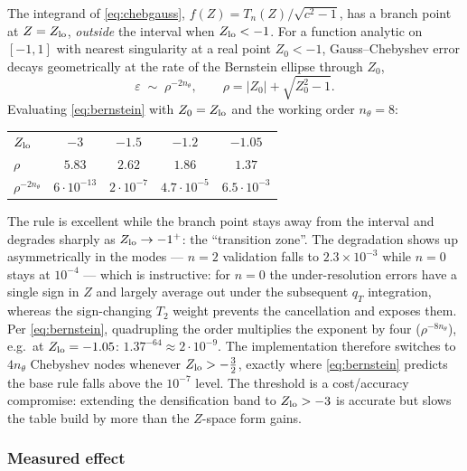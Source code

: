 \documentclass[11pt]{article}
\begin{document}
The integrand of \eqref{eq:chebgauss}, $f(Z)=T_n(Z)/\sqrt{c^{2}-1}$, has
a branch point at $Z=Z_{\rm lo}$, \emph{outside} the interval when
$Z_{\rm lo}<-1$.  For a function analytic on $[-1,1]$ with nearest
singularity at a real point $Z_0<-1$, Gauss--Chebyshev error decays
geometrically at the rate of the Bernstein ellipse through $Z_0$,
\begin{equation}
\varepsilon \;\sim\; \rho^{-2n_\theta},
\qquad
\rho=|Z_0|+\sqrt{Z_0^{2}-1} .
\label{eq:bernstein}
\end{equation}
Evaluating \eqref{eq:bernstein} with $Z_0=Z_{\rm lo}$ and the working
order $n_\theta=8$:
\begin{center}
\begin{tabular}{lcccc}
\hline
$Z_{\rm lo}$ & $-3$ & $-1.5$ & $-1.2$ & $-1.05$\\
$\rho$ & $5.83$ & $2.62$ & $1.86$ & $1.37$\\
$\rho^{-2n_\theta}$ & $6\cdot10^{-13}$ & $2\cdot10^{-7}$ &
$4.7\cdot10^{-5}$ & $6.5\cdot10^{-3}$\\
\hline
\end{tabular}
\end{center}
The rule is excellent while the branch point stays away from the interval and
degrades sharply as $Z_{\rm lo}\to-1^{+}$: the ``transition zone''.  The
degradation shows up asymmetrically in the modes --- $n=2$ validation falls
to $2.3\times10^{-3}$ while $n=0$ stays at $10^{-4}$ --- which is
instructive: for $n=0$ the under-resolution errors have a single sign in $Z$
and largely average out under the subsequent $q_T$ integration, whereas the
sign-changing $T_2$ weight prevents the cancellation and exposes them.  Per
\eqref{eq:bernstein}, quadrupling the order multiplies the exponent by four
($\rho^{-8n_\theta}$), e.g.\ at $Z_{\rm lo}=-1.05$:
$1.37^{-64}\approx2\cdot10^{-9}$.  The implementation therefore switches to
$4n_\theta$ Chebyshev nodes whenever $Z_{\rm lo}>-\tfrac32$, exactly where
\eqref{eq:bernstein} predicts the base rule falls above the $10^{-7}$ level.
The threshold is a cost/accuracy compromise: extending the densification band
to $Z_{\rm lo}>-3$ is accurate but slows the table build by more than the
$Z$-space form gains.

\subsubsection{Measured effect}
\end{document}
